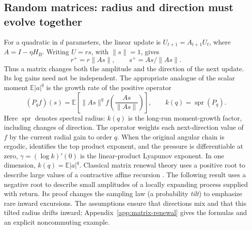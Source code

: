 \subsection{Random matrices: radius and direction must evolve together}
\label{sec:matrix-central}
For a quadratic in $d$ parameters, the linear update is
$U_{t+1}=A_{t+1}U_t$, where $A=I-\eta H_B$.
Writing $U=r s$, with $\|s\|=1$, gives
\begin{equation}
 r^+=r\|As\|,\qquad s^+=As/\|As\|.
 \label{eq:matrix-radius-direction}
\end{equation}
Thus a matrix changes both the amplitude and the direction of the next
update. Its log gains need not be independent. The appropriate analogue
of the scalar moment $\mathbb E|a|^q$ is the growth rate of the positive
operator
\begin{equation}
 (P_q f)(s)=\mathbb E\!\left[\|As\|^q
 f\!\left(\frac{As}{\|As\|}\right)\right],
 \qquad k(q)=\operatorname{spr}(P_q).
 \label{eq:matrix-pressure-main}
\end{equation}
Here $\operatorname{spr}$ denotes spectral radius: $k(q)$ is the long-run moment-growth factor, including changes of direction. The operator weights each next-direction value of $f$ by the current radial gain to order $q$. When the original
angular chain is ergodic, identifies the top product exponent, and the
pressure is differentiable at zero,
$\gamma=(\log k)'(0)$ is the linear-product Lyapunov exponent.
In one dimension, $k(q)=\mathbb E|a|^q$.
Classical matrix renewal theory uses a positive root to describe large
values of a contractive affine recursion \citep{kesten1973random,guivarchlepage2016}.
The following result uses a negative root to describe small amplitudes of a locally expanding process supplied with return. Its proof changes the sampling law (a probability \emph{tilt}) to emphasize rare inward excursions. The assumptions ensure that directions mix and that this tilted radius drifts inward; Appendix~\ref{app:matrix-renewal} gives the formulas and an explicit noncommuting example.

